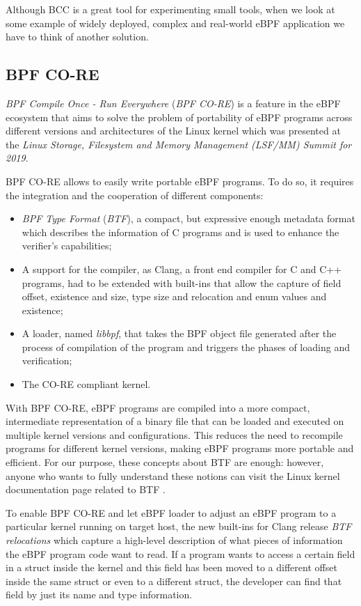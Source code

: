 Although BCC is a great tool for experimenting small tools, when we look at some example of widely deployed, complex and real-world eBPF application we have to think of another solution.

\subsection{BPF CO-RE}

\textit{BPF Compile Once - Run Everywhere} (\textit{BPF CO-RE}) is a feature in the eBPF ecosystem that aims to solve the problem of portability of eBPF programs across different versions and architectures of the Linux kernel which was presented at the \textit{Linux Storage, Filesystem and Memory Management (LSF/MM) Summit for 2019}.

BPF CO-RE allows to easily write portable eBPF programs.
To do so, it requires the integration and the cooperation of different components:

\begin{itemize}
	\item 
		\textit{BPF Type Format} (\textit{BTF}), a compact, but expressive enough metadata format which describes the information of C programs and is used to enhance the verifier's capabilities;
	\item 
		A support for the compiler, as Clang, a front end compiler for C and C++ programs, had to be extended with built-ins that allow the capture of field offset, existence and size, type size and relocation and enum values and existence;
	\item 
		A loader, named \textit{libbpf}, that takes the BPF object file generated after the process of compilation of the program and triggers the phases of loading and verification;
	\item 
		The CO-RE compliant kernel.
\end{itemize}

With BPF CO-RE, eBPF programs are compiled into a more compact, intermediate representation of a binary file that can be loaded and executed on multiple kernel versions and configurations.
This reduces the need to recompile programs for different kernel versions, making eBPF programs more portable and efficient. 
For our purpose, these concepts about BTF are enough: however, anyone who wants to fully understand these notions can visit the Linux kernel documentation page related to BTF \cite{BTFKernelDoc}.

To enable BPF CO-RE and let eBPF loader to adjust an eBPF program to a particular kernel running on target host, the new built-ins for Clang release \textit{BTF relocations} which capture a high-level description of what pieces of information the eBPF program code want to read.
If a program wants to access a certain field in a struct inside the kernel and this field has been moved to a different offset inside the same struct or even to a different struct, the developer can find that field by just its name and type information.

